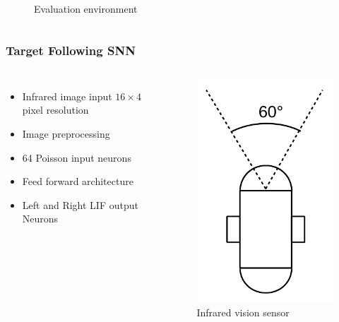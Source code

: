 \begin{frame}
\begin{columns}
\begin{overprint}
\begin{figure}
					\caption{Evaluation environment}
					\label{fig:eval_path}
				\end{figure}
			\end{overprint}
	\end{columns}
\end{frame}

\begin{frame}
	\frametitle{Target Following SNN}
	\begin{columns}
			\begin{itemize}
				\item <1-> Infrared image input $16 \times 4 $ pixel resolution
				\item <2-> Image preprocessing
				\item <3-> 64 Poisson input neurons
				\item <3-> Feed forward architecture
				\item <3-> Left and Right LIF output Neurons
			\end{itemize}
			\begin{overprint}
				\begin{figure}
					\centering
					\includegraphics[height=0.7\textheight]{img/sensors_a.pdf}
					\caption{Infrared vision sensor}
					\label{fig:sensor_a}
				\end{figure}

\end{overprint}
\end{columns}
\end{frame}

